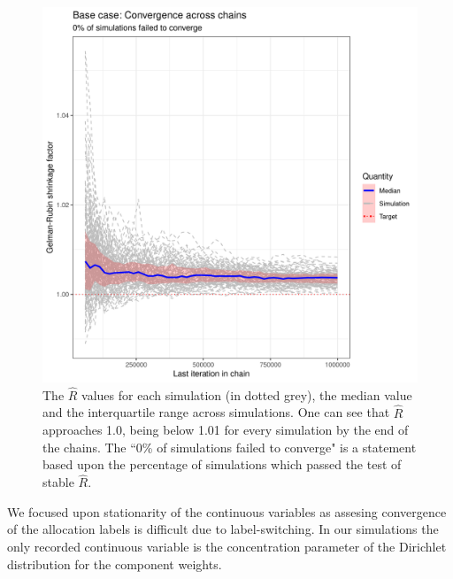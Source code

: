 \documentclass[]{article}
\begin{document}
\begin{figure} [!tpb]
	\centering
	\includegraphics[scale=0.65]{./Images/Simulations/Convergence/base_caseConvergenceAcrossChains.png}
	\caption{The $\hat{R}$ values for each simulation (in dotted grey), the median value and the interquartile range across simulations. One can see that $\hat{R}$ approaches 1.0, being below 1.01 for every simulation by the end of the chains. The ``0\% of simulations failed to converge" is a statement based upon the percentage of simulations which passed the test of stable $\hat{R}$.}
	\label{fig:simBaseCaseRhat}
\end{figure}

We focused upon stationarity of the continuous variables as assesing convergence of the allocation labels is difficult due to label-switching. In our simulations the only recorded continuous variable is the concentration parameter of the Dirichlet distribution for the component weights. 
\end{document}
